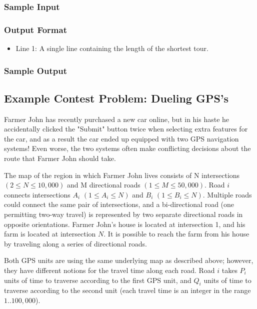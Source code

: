 \subsubsection{Sample Input}

\subsubsection{Output Format}
\begin{itemize}
	\item Line 1: A single line containing the length of the shortest tour. 
\end{itemize}

\subsubsection{Sample Output}

\subsection{Example Contest Problem: Dueling GPS's\cite{gpsduel}}
Farmer John has recently purchased a new car online, but in his haste he accidentally clicked the "Submit" button twice when selecting extra
features for the car, and as a result the car ended up equipped with two GPS navigation systems!  
Even worse, the two systems often make conflicting decisions about the route that Farmer John should take.

The map of the region in which Farmer John lives consists of N intersections $(2 \leq N \leq 10,000)$ and M directional roads $(1 \leq M \leq 50,000)$.  
Road $i$ connects intersections $A_i$ $(1 \leq A_i \leq N)$ and $B_i$ $(1 \leq B_i \leq N)$. 
Multiple roads could connect the same pair of intersections, and a bi-directional road (one permitting two-way travel) is represented 
by two separate directional roads in opposite orientations.  
Farmer John's house is located at intersection 1, and his farm is located at intersection $N$.  
It is possible to reach the farm from his house by traveling along a series of directional roads.

Both GPS units are using the same underlying map as described above; however, they have different notions for the travel time along each road. 
Road $i$ takes $P_i$ units of time to traverse according to the first GPS unit, and $Q_i$ units of time to traverse according to the second unit 
(each travel time is an integer in the range $1..100,000$).

